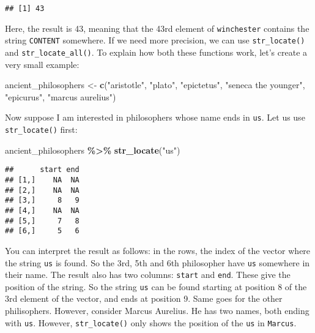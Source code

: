 \documentclass[
]{article}
\newenvironment{Shaded}{\begin{snugshade}}{\end{snugshade}}
\newcommand{\KeywordTok}[1]{\textcolor[rgb]{0.13,0.29,0.53}{\textbf{#1}}}
\newcommand{\NormalTok}[1]{#1}
\newcommand{\OperatorTok}[1]{\textcolor[rgb]{0.81,0.36,0.00}{\textbf{#1}}}
\newcommand{\StringTok}[1]{\textcolor[rgb]{0.31,0.60,0.02}{#1}}
\begin{document}
\begin{verbatim}
## [1] 43
\end{verbatim}

Here, the result is 43, meaning that the 43rd element of \texttt{winchester} contains the string \texttt{CONTENT}
somewhere. If we need more precision, we can use \texttt{str\_locate()} and \texttt{str\_locate\_all()}. To explain
how both these functions work, let's create a very small example:

\begin{Shaded}
\begin{Highlighting}[]
\NormalTok{ancient\_philosophers \textless{}{-}}\StringTok{ }\KeywordTok{c}\NormalTok{(}\StringTok{"aristotle"}\NormalTok{, }\StringTok{"plato"}\NormalTok{, }\StringTok{"epictetus"}\NormalTok{, }\StringTok{"seneca the younger"}\NormalTok{, }\StringTok{"epicurus"}\NormalTok{, }\StringTok{"marcus aurelius"}\NormalTok{)}
\end{Highlighting}
\end{Shaded}

Now suppose I am interested in philosophers whose name ends in \texttt{us}. Let us use \texttt{str\_locate()} first:

\begin{Shaded}
\begin{Highlighting}[]
\NormalTok{ancient\_philosophers }\OperatorTok{\%\textgreater{}\%}
\StringTok{  }\KeywordTok{str\_locate}\NormalTok{(}\StringTok{"us"}\NormalTok{)}
\end{Highlighting}
\end{Shaded}

\begin{verbatim}
##      start end
## [1,]    NA  NA
## [2,]    NA  NA
## [3,]     8   9
## [4,]    NA  NA
## [5,]     7   8
## [6,]     5   6
\end{verbatim}

You can interpret the result as follows: in the rows, the index of the vector where the
string \texttt{us} is found. So the 3rd, 5th and 6th philosopher have \texttt{us} somewhere in their name.
The result also has two columns: \texttt{start} and \texttt{end}. These give the position of the string. So the
string \texttt{us} can be found starting at position 8 of the 3rd element of the vector, and ends at position
9. Same goes for the other philisophers. However, consider Marcus Aurelius. He has two names, both
ending with \texttt{us}. However, \texttt{str\_locate()} only shows the position of the \texttt{us} in \texttt{Marcus}.
\end{document}
